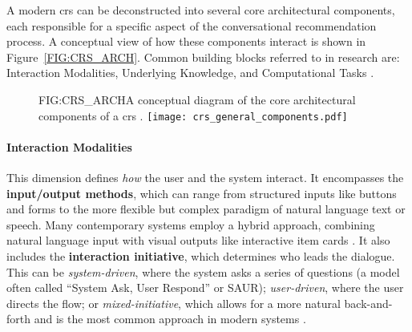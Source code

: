 A modern \ac{crs} can be deconstructed into several core architectural components, each responsible for a specific aspect of the conversational recommendation process. A conceptual view of how these components interact is shown in Figure~\ref{FIG:CRS_ARCH}. Common building blocks referred to in research are: Interaction Modalities, Underlying Knowledge, and Computational Tasks \cite{SOTA-CRS-SURVEY}.

\begin{figure}[CRS Architectural Components]{FIG:CRS_ARCH}{A conceptual diagram of the core architectural components of a \acl{crs} \cite{CRS-EVALUATION}.}
    \texttt{[image: crs\_general\_components.pdf]}
\end{figure}

\paragraph{Interaction Modalities}
This dimension defines \textit{how} the user and the system interact. It encompasses the \textbf{input/output methods}, which can range from structured inputs like buttons and forms to the more flexible but complex paradigm of natural language text or speech. Many contemporary systems employ a hybrid approach, combining natural language input with visual outputs like interactive item cards \cite{SOTA-CRS-UI}. It also includes the \textbf{interaction initiative}, which determines who leads the dialogue. This can be \textit{system-driven}, where the system asks a series of questions (a model often called ``System Ask, User Respond'' or SAUR); \textit{user-driven}, where the user directs the flow; or \textit{mixed-initiative}, which allows for a more natural back-and-forth and is the most common approach in modern systems \cite[Section 3]{SOTA-CRS-SURVEY}.

